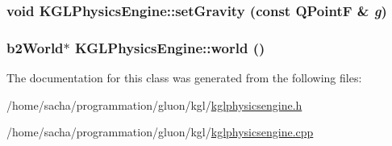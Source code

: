 \hypertarget{class_k_g_l_physics_engine_ada02faca27bd54213c1c73af61d0795}{
\subsubsection[{setGravity}]{\setlength{\rightskip}{0pt plus 5cm}void KGLPhysicsEngine::setGravity (const QPointF \& {\em g})}}
\label{class_k_g_l_physics_engine_ada02faca27bd54213c1c73af61d0795}


\hypertarget{class_k_g_l_physics_engine_099fcf17ad1ecb1400e794c56705966a}{
\subsubsection[{world}]{\setlength{\rightskip}{0pt plus 5cm}b2World$\ast$ KGLPhysicsEngine::world ()}}
\label{class_k_g_l_physics_engine_099fcf17ad1ecb1400e794c56705966a}




The documentation for this class was generated from the following files:\begin{CompactItemize}
\item 
/home/sacha/programmation/gluon/kgl/\hyperlink{kglphysicsengine_8h}{kglphysicsengine.h}\item 
/home/sacha/programmation/gluon/kgl/\hyperlink{kglphysicsengine_8cpp}{kglphysicsengine.cpp}\end{CompactItemize}
